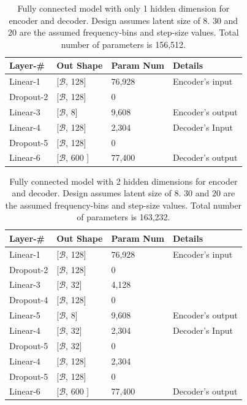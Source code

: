 \documentclass[\main/thesis.tex]{subfiles}
\begin{document}
\begin{table}[]
\begin{tabular}{|p{28mm}|p{25mm}|p{23mm}|p{50mm}|}
\hline
Layer-\# & Out Shape & Param Num & Details  \\ \hline
Linear-1 & [$\mathcal{B}$, 128]  & 76,928 & Encoder's input \\ \hline
Dropout-2 & [$\mathcal{B}$, 128] & 0 &  \\ \hline
Linear-3 & [$\mathcal{B}$, 8] & 9,608 & Encoder's output \\ \hline
Linear-4 & [$\mathcal{B}$, 128] & 2,304 & Decoder's Input \\ \hline
Dropout-5 & [$\mathcal{B}$, 128]  & 0 &  \\ \hline
Linear-6  & [$\mathcal{B}$, 600 ] &  77,400 &Decoder's output\\ \hline
\end{tabular}
\caption{Fully connected model with only 1 hidden dimension for encoder and decoder. Design assumes latent size of 8. 30 and 20 are the assumed frequency-bins and step-size values. Total number of parameters is 156,512.}
\label{table:FC1_AUTOENCODER}
\end{table}

\begin{table}[]

\begin{tabular}{|p{28mm}|p{25mm}|p{23mm}|p{50mm}|}
\hline
Layer-\# & Out Shape & Param Num & Details  \\ \hline
Linear-1 & [$\mathcal{B}$, 128]  & 76,928 & Encoder's input \\ \hline
Dropout-2 & [$\mathcal{B}$, 128] & 0 &  \\ \hline
Linear-3 & [$\mathcal{B}$, 32]  & 4,128 & \\ \hline
Dropout-4 & [$\mathcal{B}$, 128] & 0 &  \\ \hline
Linear-5 & [$\mathcal{B}$, 8] & 9,608 & Encoder's output \\ \hline
Linear-4 & [$\mathcal{B}$, 32] & 2,304 & Decoder's Input \\ \hline
Dropout-5 & [$\mathcal{B}$, 32]  & 0 &  \\ \hline
Linear-4 & [$\mathcal{B}$, 128] & 2,304 & \\ \hline
Dropout-5 & [$\mathcal{B}$, 128]  & 0 &  \\ \hline
Linear-6  & [$\mathcal{B}$, 600 ] &  77,400 &Decoder's output\\ \hline
\end{tabular}
\caption{Fully connected model with 2 hidden dimensions for encoder and decoder. Design assumes latent size of 8. 30 and 20 are the assumed frequency-bins and step-size values. Total number of parameters is 163,232.}
\label{table:FC2_AUTOENCODER}
\end{table}
\end{document}
